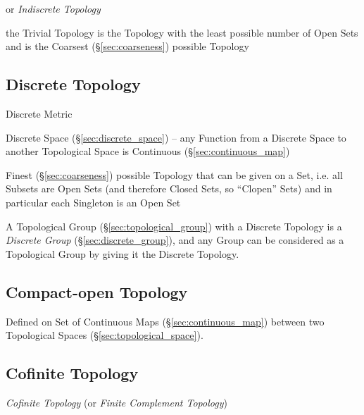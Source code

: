 or \emph{Indiscrete Topology}

the Trivial Topology is the Topology with the least possible number of Open
Sets and is the Coarsest (\S\ref{sec:coarseness}) possible Topology



\subsection{Discrete Topology}\label{sec:discrete_topology}

Discrete Metric

Discrete Space (\S\ref{sec:discrete_space}) -- any Function from a Discrete
Space to another Topological Space is Continuous (\S\ref{sec:continuous_map})

Finest (\S\ref{sec:coarseness}) possible Topology that can be given on a Set,
i.e. all Subsets are Open Sets (and therefore Closed Sets, so ``Clopen'' Sets)
and in particular each Singleton is an Open Set

A Topological Group (\S\ref{sec:topological_group}) with a Discrete Topology is
a \emph{Discrete Group} (\S\ref{sec:discrete_group}), and any Group can be
considered as a Topological Group by giving it the Discrete Topology.



\subsection{Compact-open Topology}\label{sec:compact_open}

Defined on Set of Continuous Maps (\S\ref{sec:continuous_map}) between
two Topological Spaces (\S\ref{sec:topological_space}).



\subsection{Cofinite Topology}\label{sec:cofinite_topology}

\emph{Cofinite Topology} (or \emph{Finite Complement Topology})



